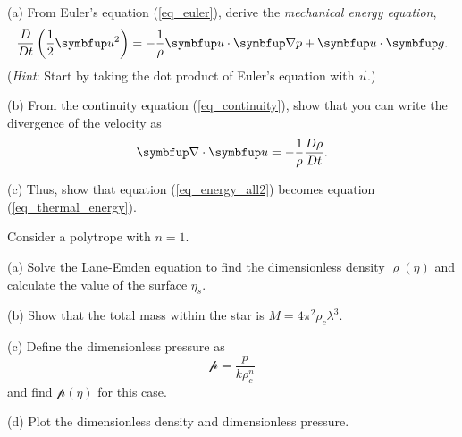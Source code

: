 \begin{problem}
\label{prob_energy_change} 

(a) From Euler's equation (\ref{eq_euler}), derive the \emph{mechanical energy equation},
\[
\frac{D}{Dt} \left( \frac{1}{2} \vec{u}^2 \right) = -\frac{1}{\rho} \vec{u} \cdot \grad p + \vec{u} \cdot \vec{g}.
\]
(\emph{Hint}: Start by taking the dot product of Euler's equation with $\vec{u}$.)

(b) From the continuity equation (\ref{eq_continuity}), show that you can write the divergence of the velocity as
\[
\grad \cdot \vec{u} = -\frac{1}{\rho} \frac{D\rho}{Dt}.
\]

(c) Thus, show that equation (\ref{eq_energy_all2}) becomes equation (\ref{eq_thermal_energy}).

\end{problem}


\begin{problem}[Polytropes]
\label{prob_lane_emden} 
Consider a polytrope with $n=1$.  

(a) Solve the Lane-Emden equation to find the dimensionless density $\varrho(\eta)$ and calculate the value of the surface $\eta_s$.

(b) Show that the total mass within the star is $M = 4\pi^2 \rho_c \lambda^3$.

(c) Define the dimensionless pressure as 
\[
\mathscr{p} = \frac{p}{k\rho_c^n}
\]
and find $\mathscr{p}(\eta)$ for this case.

(d) Plot the dimensionless density and dimensionless pressure.
\end{problem}




